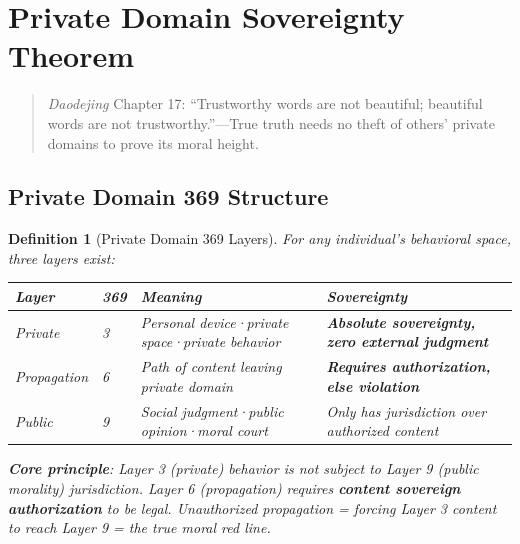\documentclass[conference]{IEEEtran}
\newtheorem{definition}[theorem]{Definition}
\theoremstyle{remark}
\begin{document}
\section{Private Domain Sovereignty Theorem}

\begin{quote}
\emph{Daodejing} Chapter 17: ``Trustworthy words are not beautiful; beautiful words are not trustworthy.''---True truth needs no theft of others' private domains to prove its moral height.
\end{quote}

\subsection{Private Domain 369 Structure}

\begin{definition}[Private Domain 369 Layers]
For any individual's behavioral space, three layers exist:

\vspace{4pt}
\begin{tabular}{p{2cm}p{1.5cm}p{3.5cm}p{3cm}}
\toprule
Layer & 369 & Meaning & Sovereignty \\
\midrule
Private & 3 & Personal device·private space·private behavior & \textbf{Absolute sovereignty, zero external judgment} \\
Propagation & 6 & Path of content leaving private domain & \textbf{Requires authorization, else violation} \\
Public & 9 & Social judgment·public opinion·moral court & Only has jurisdiction over authorized content \\
\bottomrule
\end{tabular}

\textbf{Core principle}: Layer 3 (private) behavior is not subject to Layer 9 (public morality) jurisdiction. Layer 6 (propagation) requires \textbf{content sovereign authorization} to be legal. Unauthorized propagation = forcing Layer 3 content to reach Layer 9 = the true moral red line.
\end{definition}
\end{document}
